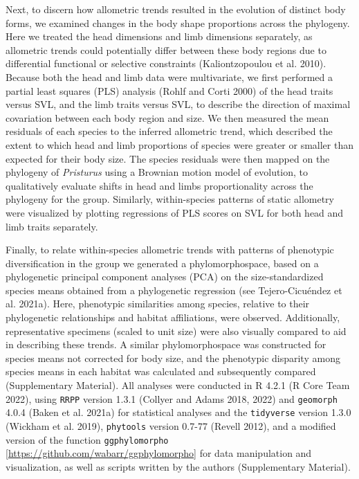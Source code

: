\documentclass[
  11pt,
]{article}
\begin{document}
Next, to discern how allometric trends resulted in the evolution of
distinct body forms, we examined changes in the body shape proportions
across the phylogeny. Here we treated the head dimensions and limb
dimensions separately, as allometric trends could potentially differ
between these body regions due to differential functional or selective
constraints (Kaliontzopoulou et al. 2010). Because both the head and
limb data were multivariate, we first performed a partial least squares
(PLS) analysis (Rohlf and Corti 2000) of the head traits versus SVL, and
the limb traits versus SVL, to describe the direction of maximal
covariation between each body region and size. We then measured the mean
residuals of each species to the inferred allometric trend, which
described the extent to which head and limb proportions of species were
greater or smaller than expected for their body size. The species
residuals were then mapped on the phylogeny of \emph{Pristurus} using a
Brownian motion model of evolution, to qualitatively evaluate shifts in
head and limbs proportionality across the phylogeny for the group.
Similarly, within-species patterns of static allometry were visualized
by plotting regressions of PLS scores on SVL for both head and limb
traits separately. \hfill\break

Finally, to relate within-species allometric trends with patterns of
phenotypic diversification in the group we generated a phylomorphospace,
based on a phylogenetic principal component analyses (PCA) on the
size-standardized species means obtained from a phylogenetic regression
(see Tejero-Cicuéndez et al. 2021a). Here, phenotypic similarities among
species, relative to their phylogenetic relationships and habitat
affiliations, were observed. Additionally, representative specimens
(scaled to unit size) were also visually compared to aid in describing
these trends. A similar phylomorphospace was constructed for species
means not corrected for body size, and the phenotypic disparity among
species means in each habitat was calculated and subsequently compared
(Supplementary Material). All analyses were conducted in R 4.2.1 (R Core
Team 2022), using \texttt{RRPP} version 1.3.1 (Collyer and Adams 2018,
2022) and \texttt{geomorph} 4.0.4 (Baken et al. 2021a) for statistical
analyses and the \texttt{tidyverse} version 1.3.0 (Wickham et al. 2019),
\texttt{phytools} version 0.7-77 (Revell 2012), and a modified version
of the function \texttt{ggphylomorpho}
{[}\url{https://github.com/wabarr/ggphylomorpho}{]} for data
manipulation and visualization, as well as scripts written by the
authors (Supplementary Material).
\end{document}
